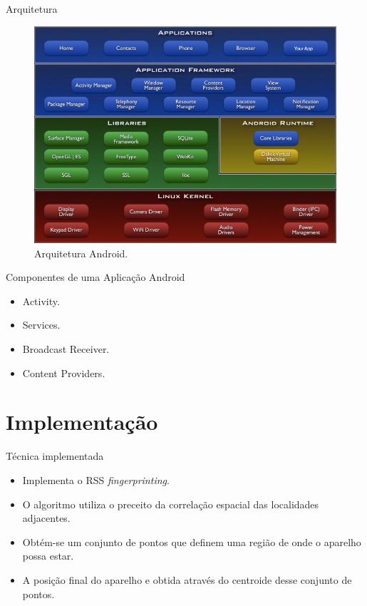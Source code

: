 \documentclass{beamer}
\newlength{\wideitemsep}
\let\olditem\item
\renewcommand{\item}{\setlength{\itemsep}{\wideitemsep}\olditem}
\begin{document}
\begin{frame}{Arquitetura}
\begin{figure}[hb]
\centering
\includegraphics[scale=0.38]{../images/Android-architecture.jpg}
\caption{Arquitetura Android\cite{android1}. }
\label{fig:android-arc}
\end{figure}
\end{frame}

\begin{frame}{Componentes de uma Aplicação Android}
\begin{itemize}
 \item Activity.
 \item Services.
 \item Broadcast Receiver.
 \item Content Providers.
\end{itemize}
\end{frame}

\section{Implementação}
\begin{frame}{Técnica implementada}
\begin{itemize}
 \item Implementa o RSS \textit{fingerprinting}.
 \item O algoritmo utiliza o preceito da correlação espacial das localidades adjacentes.
 \item Obtém-se um conjunto de pontos que definem uma região de onde o aparelho possa estar.
 \item A posição final do aparelho 
  e obtida através do centroide desse conjunto de pontos.
\end{itemize}
\end{frame}
\end{document}
